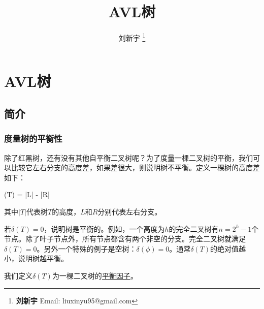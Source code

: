 \documentclass[UTF8]{article}
\begin{document}


\title{AVL树}

\author{刘新宇
\thanks{{\bfseries 刘新宇} \newline
  Email: liuxinyu95@gmail.com \newline}
  }

\maketitle
\fi


\ifx\wholebook\relax
\chapter{AVL树}
\fi

\section{简介}
\label{introduction} 

\subsection{度量树的平衡性}

除了红黑树，还有没有其他自平衡二叉树呢？为了度量一棵二叉树的平衡，我们可以比较它左右分支的高度差，如果差很大，则说明树不平衡。定义一棵树的高度差如下：

\be
  \delta(T) = |L| - |R|
\ee

其中$|T|$代表树$T$的高度，$L$和$R$分别代表左右分支。

若$\delta(T) = 0$，说明树是平衡的。例如，一个高度为$h$的完全二叉树有$n = 2^h-1$个节点。除了叶子节点外，所有节点都含有两个非空的分支。完全二叉树就满足$\delta(T)=0$。另外一个特殊的例子是空树：$\delta(\phi) = 0$。通常$\delta(T)$的绝对值越小，说明树越平衡。

我们定义$\delta(T)$为一棵二叉树的\underline{平衡因子}。

\end{document}
